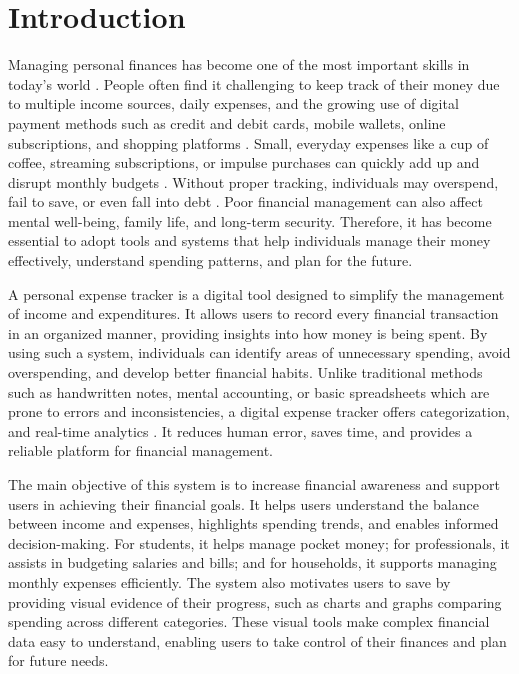 \documentclass[12pt]{report} %
\begin{document}
\chapter{Introduction}
\justifying
Managing personal finances has become one of the most important skills in today's world \cite{lusardi2014financial}.
People often find it challenging to keep track of their money due to multiple income
sources, daily expenses, and the growing use of digital payment methods such as credit and
debit cards, mobile wallets, online subscriptions, and shopping platforms \cite{capgemini2021payments}. Small, everyday
expenses like a cup of coffee, streaming subscriptions, or impulse purchases can quickly add
up and disrupt monthly budgets \cite{bamforth2018spending}. Without proper tracking, individuals may overspend, fail
to save, or even fall into debt \cite{apa2020stress}. Poor financial management can also affect mental well-being,
family life, and long-term security. Therefore, it has become essential to adopt tools and
systems that help individuals manage their money effectively, understand spending patterns,
and plan for the future.

A personal expense tracker is a digital tool designed to simplify the management of income 
and expenditures. It allows users to record every financial transaction in an organized
manner, providing insights into how money is being spent. By using such a system, individuals
can identify areas of unnecessary spending, avoid overspending, and develop better
financial habits. Unlike traditional methods such as handwritten notes, mental accounting,
or basic spreadsheets which are prone to errors and inconsistencies, a digital expense tracker
offers categorization, and real-time analytics \cite{verma2024research}. It reduces human error, saves
time, and provides a reliable platform for financial management.

The main objective of this system is to increase financial awareness and support users in
achieving their financial goals. It helps users understand the balance between income and
expenses, highlights spending trends, and enables informed decision-making. For students,
it helps manage pocket money; for professionals, it assists in budgeting salaries and bills;
and for households, it supports managing monthly expenses efficiently. The system also
motivates users to save by providing visual evidence of their progress, such as charts and
graphs comparing spending across different categories. These visual tools make complex
financial data easy to understand, enabling users to take control of their finances and plan
for future needs.
\end{document}
